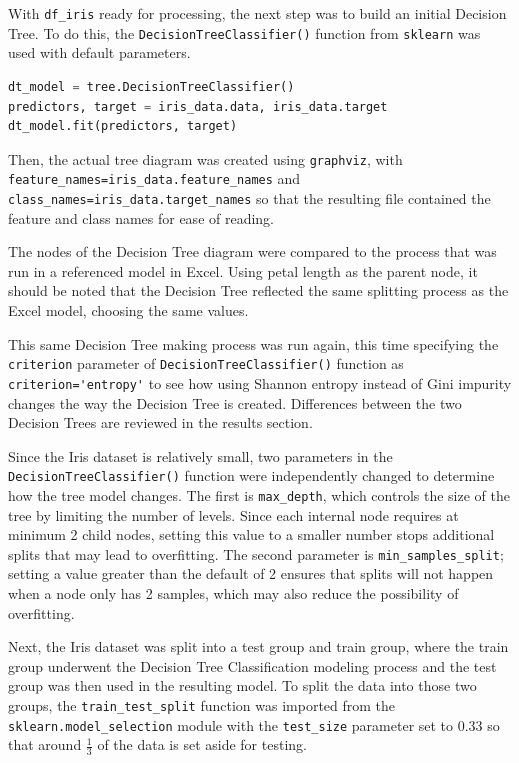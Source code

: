 \documentclass[journal]{IEEEtran}
\begin{document}
With \lstinline{df_iris} ready for processing, the next step was to build an initial Decision Tree. To do this, the \lstinline{DecisionTreeClassifier()} function from \lstinline{sklearn} was used with default parameters.

\begin{lstlisting}[language=Python, caption=Building the Decision Tree]
dt_model = tree.DecisionTreeClassifier()
predictors, target = iris_data.data, iris_data.target
dt_model.fit(predictors, target)
\end{lstlisting}

Then, the actual tree diagram was created using \lstinline{graphviz}, with \lstinline{feature_names=iris_data.feature_names} and \lstinline{class_names=iris_data.target_names} so that the resulting file contained the feature and class names for ease of reading. 

The nodes of the Decision Tree diagram were compared to the process that was run in a referenced model in Excel. Using petal length as the parent node, it should be noted that the Decision Tree reflected the same splitting process as the Excel model, choosing the same values.

This same Decision Tree making process was run again, this time specifying the \lstinline{criterion} parameter of \lstinline{DecisionTreeClassifier()} function as \lstinline{criterion='entropy'} to see how using Shannon entropy instead of Gini impurity changes the way the Decision Tree is created. Differences between the two Decision Trees are reviewed in the results section.

Since the Iris dataset is relatively small, two parameters in the \lstinline{DecisionTreeClassifier()} function were independently changed to determine how the tree model changes. The first is \lstinline{max_depth}, which controls the size of the tree by limiting the number of levels. Since each internal node requires at minimum 2 child nodes, setting this value to a smaller number stops additional splits that may lead to overfitting. The second parameter is \lstinline{min_samples_split}; setting a value greater than the default of 2 ensures that splits will not happen when a node only has 2 samples, which may also reduce the possibility of overfitting. 

Next, the Iris dataset was split into a test group and train group, where the train group underwent the Decision Tree Classification modeling process and the test group was then used in the resulting model. To split the data into those two groups, the \lstinline{train_test_split} function was imported from the \lstinline{sklearn.model_selection} module with the \lstinline{test_size} parameter set to 0.33 so that around \(\frac{1}{3}\) of the data is set aside for testing. 
\end{document}
